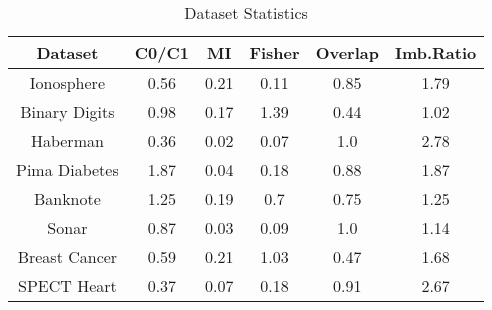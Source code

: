 \begin{table}[htbp]
\caption{Dataset Statistics}
\begin{center}
\begin{tabular}{|c|c|c|c|c|c|}
\hline
\textbf{Dataset} & \textbf{C0/C1} & \textbf{MI} & \textbf{Fisher} & \textbf{Overlap} & \textbf{Imb.Ratio} \\ \hline
Ionosphere & 0.56 & 0.21 & 0.11 & 0.85 & 1.79 \\ \hline
Binary Digits & 0.98 & 0.17 & 1.39 & 0.44 & 1.02 \\ \hline
Haberman & 0.36 & 0.02 & 0.07 & 1.0 & 2.78 \\ \hline
Pima Diabetes & 1.87 & 0.04 & 0.18 & 0.88 & 1.87 \\ \hline
Banknote & 1.25 & 0.19 & 0.7 & 0.75 & 1.25 \\ \hline
Sonar & 0.87 & 0.03 & 0.09 & 1.0 & 1.14 \\ \hline
Breast Cancer & 0.59 & 0.21 & 1.03 & 0.47 & 1.68 \\ \hline
SPECT Heart & 0.37 & 0.07 & 0.18 & 0.91 & 2.67 \\ \hline
\end{tabular}
\label{tab:statistics}
\end{center}
\end{table}